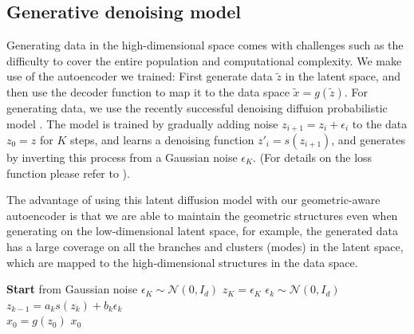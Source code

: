 \documentclass{article}
\theoremstyle{plain}
\theoremstyle{definition}
\theoremstyle{remark}
\newcommand{\methodshort}{GAGA\xspace}
\begin{document}
\subsection{Generative denoising model}
\par Generating data in the high-dimensional space comes with challenges such as the difficulty to cover the entire population and computational complexity. We make use of the autoencoder we trained: First generate data $\tilde z$ in the latent space, and then use the decoder function to map it to the data space $\tilde x=g(\tilde z)$. For generating data, we use the recently successful denoising diffuion probabilistic model \cite{ho2020denoising,dhariwal2021diffusion}. The model is trained by gradually adding noise $z_{i+1}=z_i+\epsilon_i$ to the data $z_0=z$ for $K$ steps, and learns a denoising function $z'_i=s(z_{i+1})$, and generates by inverting this process from a Gaussian noise $\epsilon_K$. (For details on the loss function please refer to \cite{ho2020denoising,dhariwal2021diffusion}).
\par The advantage of using this latent diffusion model \cite{rombach2022high} with our geometric-aware autoencoder is that we are able to maintain the geometric structures even when generating on the low-dimensional latent space, for example, the generated data has a large coverage on all the branches and clusters (modes) in the latent space, which are mapped to the high-dimensional structures in the data space.

\begin{algorithm}[htbp]
\caption{Generate denoising model with \methodshort}
\begin{algorithmic}[1]
\State \textbf{Start} from Gaussian noise $\epsilon_K \sim \mathcal{N}(0, I_d)$
\State $z_K = \epsilon_K$
    \State $\epsilon_k \sim \mathcal{N}(0, I_d)$
    \State $z_{k-1} = a_k s(z_k) + b_k \epsilon_k$ \\
\EndFor
\State $x_0 = g(z_0)$
\State \Return $x_0$
\end{algorithmic}
\end{algorithm}
\end{document}
